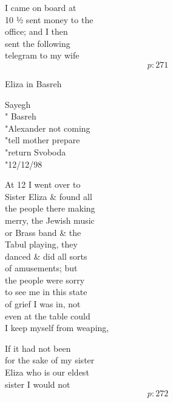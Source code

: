 \documentclass{report}
\begin{document}
	\par{
 	I came on board at\ \\10 ½ sent money to the\ \\office; and I then\ \\sent the following\ \\telegram to my wife\ \\
  \[p: 271 \]

	}



	\par{
 	Eliza in Basreh\ \\
	}

	\par{
 	Sayegh\ \\" Basreh\ \\"Alexander not coming\ \\"tell mother prepare\ \\"return Svoboda\ \\"12/12/98\ \\
	}

	\par{
 	At 12 I went over to\ \\Sister Eliza \& found all\ \\the people there making\ \\merry, the Jewish music\ \\or Brass band \& the\ \\Tabul playing, they\ \\danced \& did all sorts\ \\of amusements; but\ \\the people were sorry\ \\to see me in this state\ \\of grief I was in, not\ \\even at the table could\ \\I keep myself from weaping,\ \\
	}

	\par{
 	If it had not been\ \\for the sake of my sister\ \\Eliza who is our eldest\ \\sister I would not\ \\
  \[p: 272 \]

	}
\end{document}
